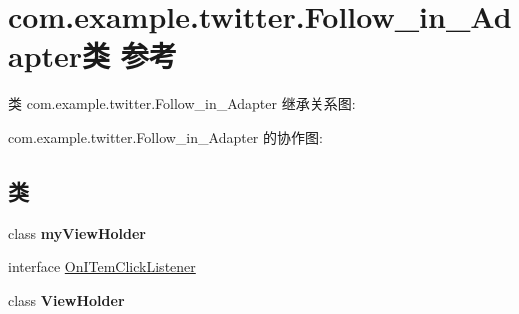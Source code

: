 \hypertarget{classcom_1_1example_1_1twitter_1_1_follow__in___adapter}{}\section{com.\+example.\+twitter.\+Follow\+\_\+in\+\_\+\+Adapter类 参考}
\label{classcom_1_1example_1_1twitter_1_1_follow__in___adapter}


类 com.\+example.\+twitter.\+Follow\+\_\+in\+\_\+\+Adapter 继承关系图\+:


com.\+example.\+twitter.\+Follow\+\_\+in\+\_\+\+Adapter 的协作图\+:
\subsection*{类}
\begin{DoxyCompactItemize}
\item 
class {\bfseries my\+View\+Holder}
\item 
interface \mbox{\hyperlink{interfacecom_1_1example_1_1twitter_1_1_follow__in___adapter_1_1_on_i_tem_click_listener}{On\+I\+Tem\+Click\+Listener}}
\item 
class {\bfseries View\+Holder}
\end{DoxyCompactItemize}
